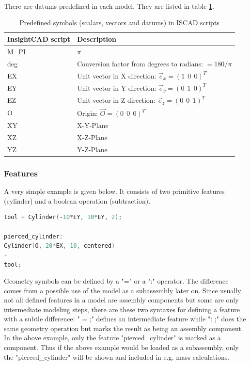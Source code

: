 There are datums predefined in each model. They are listed in table \ref{tab:iscad_datums}.

\begin{table}[h!]
\begin{tabular}{ll}
\hline
InsightCAD script & Description \\
\hline\hline
  M\_PI                    & $\pi$ \\
  deg                     & Conversion factor from degrees to radians: $=180/\pi$ \\
 EX                                &  Unit vector in X direction: $\vec e_x = (1 ~~ 0 ~~ 0)^T$\\
 EY                                &  Unit vector in Y direction: $\vec e_y = (0 ~~ 1 ~~ 0)^T$\\
 EZ                                &  Unit vector in Z direction: $\vec e_z = (0 ~~ 0 ~~ 1)^T$\\
 O                                 &  Origin: $\vec O = (0 ~~ 0 ~~ 0)^T$\\
  XY                      & X-Y-Plane\\
  XZ                      & X-Z-Plane\\
  YZ                      & Y-Z-Plane\\
\hline
\end{tabular}
\caption{Predefined symbols (scalars, vectors and datums) in ISCAD scripts}
\label{tab:iscad_datums}
\end{table}

\FloatBarrier

\subsubsection{Features}

A very simple example is given below. It consists of two primitive
features (cylinder) and a boolean operation (subtraction).

\begin{lstlisting}[language=c++]
tool = Cylinder(-10*EY, 10*EY, 2);

pierced_cylinder:
Cylinder(O, 20*EX, 10, centered)
-
tool;
\end{lstlisting}
    


Geometry symbols can be defined by a "=" or a ":" operator. 
The difference comes from a possible use of the model as a subassembly later
on. Since usually not all defined features in a model are assembly
components but some are only intermediate modeling steps, there are
these two syntaxes for defining a feature with a subtle difference:
" = ;" defines an intermediate feature
while ": ;" does the same geometry
operation but marks the result as being an assembly component. In the
above example, only the feature "pierced\_cylinder" is marked as a
component. Thus if the above example would be loaded as a subassembly,
only the "pierced\_cylinder" will be shown and included in e.g. mass
calculations.

